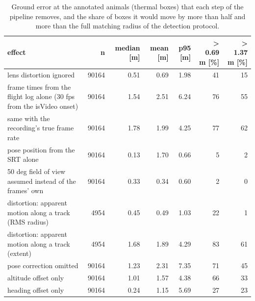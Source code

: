 \begin{table}[t]
\centering
\small
\caption{Ground error at the annotated animals (thermal boxes) that each step of the pipeline removes, and the share of boxes it would move by more than half and more than the full matching radius of the detection protocol.}
\label{tab:budget}
\begin{tabular}{lrrrrrr}
\toprule
effect & n & median [m] & mean [m] & p95 [m] & > 0.69 m [\%] & > 1.37 m [\%] \\
\midrule
lens distortion ignored & 90164 & 0.51 & 0.69 & 1.98 & 41 & 15 \\
frame times from the flight log alone (30 fps from the isVideo onset) & 90164 & 1.54 & 2.51 & 6.24 & 76 & 55 \\
same with the recording's true frame rate & 90164 & 1.78 & 1.99 & 4.25 & 77 & 62 \\
pose position from the SRT alone & 90164 & 0.13 & 1.70 & 0.66 & 5 & 2 \\
50 deg field of view assumed instead of the frames' own & 90164 & 0.33 & 0.34 & 0.60 & 2 & 0 \\
distortion: apparent motion along a track (RMS radius) & 4954 & 0.45 & 0.49 & 1.03 & 22 & 1 \\
distortion: apparent motion along a track (extent) & 4954 & 1.68 & 1.89 & 4.29 & 83 & 61 \\
pose correction omitted & 90164 & 1.23 & 2.31 & 7.35 & 71 & 45 \\
  altitude offset only & 90164 & 1.01 & 1.57 & 4.38 & 66 & 33 \\
  heading offset only & 90164 & 0.24 & 1.15 & 5.69 & 27 & 23 \\
\bottomrule
\end{tabular}
\end{table}
